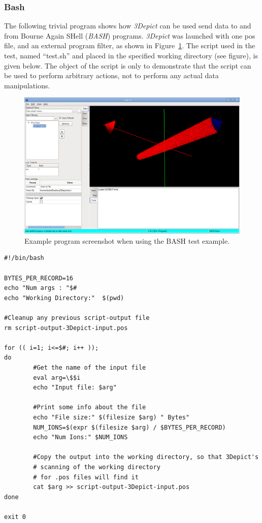 \documentclass[10pt]{article}
\begin{document}
\subsubsection{Bash}

The following trivial program shows how \emph{3Depict} can be used send data to and from Bourne Again SHell (\emph{BASH}) programs. \emph{3Depict} was launched with one pos file, and an external program filter, as shown in Figure~\ref{fig:externalProgBashSample}. The script used in the test, named ``test.sh'' and placed in the specified working directory (see figure), is given below. The object of the script is only to demonstrate that the script can be used to perform arbitrary actions, not to perform any actual data manipulations.

\begin{figure}
\begin{center}
 \includegraphics[keepaspectratio=true,width=0.85 \textwidth]{./figures/externalProgBash.png}
 \caption{Example program screenshot when using the BASH test example.}
 \label{fig:externalProgBashSample}
\end{center}
\end{figure}

\begin{verbatim}
#!/bin/bash

BYTES_PER_RECORD=16
echo "Num args : "$#
echo "Working Directory:"  $(pwd)

#Cleanup any previous script-output file
rm script-output-3Depict-input.pos

for (( i=1; i<=$#; i++ )); 
do
        #Get the name of the input file
        eval arg=\$$i
        echo "Input file: $arg"

        #Print some info about the file  
        echo "File size:" $(filesize $arg) " Bytes"
        NUM_IONS=$(expr $(filesize $arg) / $BYTES_PER_RECORD) 
        echo "Num Ions:" $NUM_IONS 

        #Copy the output into the working directory, so that 3Depict's 
        # scanning of the working directory
        # for .pos files will find it
        cat $arg >> script-output-3Depict-input.pos
done 

exit 0
\end{verbatim}
\end{document}
